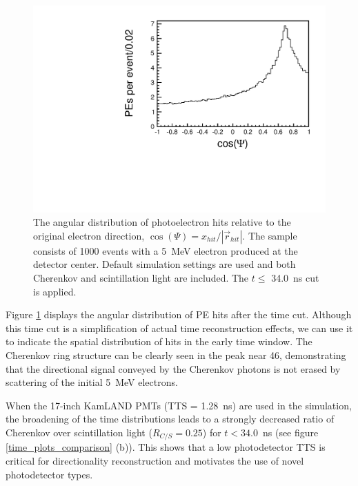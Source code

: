 \documentclass[cits]{JINST}
\begin{document}
\begin{figure}
        \begin{center}
        \includegraphics[scale=0.40]{graphs/cos_psi_34_h.pdf}
        \caption[]{The angular distribution of photoelectron hits
        relative to the original electron direction, $\cos(\Psi) =
        x_{hit}/|\vec{r}_{hit}|$. The sample consists of 1000 events
        with a 5~MeV electron produced at the detector center. Default
        simulation settings are used and both Cherenkov and
        scintillation light are included. The $t\leq$ 34.0~ns cut is applied.} 
        \label{Cherenkov_cone}
        \end{center}
\end{figure}

Figure \ref{Cherenkov_cone} displays the angular distribution of PE
hits after the time cut. Although this time cut is a simplification of actual time
reconstruction effects, we can use it to indicate the spatial
distribution of hits in the early time window. The Cherenkov ring structure
can be clearly seen in the peak near 46\textdegree, demonstrating
that the directional signal conveyed by the Cherenkov photons is not
erased by scattering of the initial 5~MeV electrons.

When the 17-inch KamLAND PMTs\cite{tajimaMaster,kume_1983} (TTS =
1.28~ns) are used in the simulation, the broadening of the time
distributions leads to a strongly decreased ratio of Cherenkov over
scintillation light ($R_{C/S}=0.25$) for $t<34.0$~ns (see
figure \ref{time_plots_comparison} (b)). This shows that a low
photodetector TTS is critical for directionality reconstruction and
motivates the use of novel photodetector types.
\end{document}
